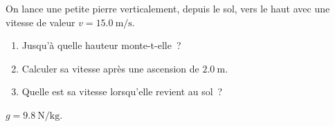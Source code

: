 On lance une petite pierre verticalement, depuis le sol, vers le haut avec une
vitesse de valeur $v=\qty{15.0}{\m\per\s}$.
\begin{enumerate}
    \item Jusqu'à quelle hauteur monte-t-elle~?
    \item Calculer sa vitesse après une ascension de $\qty{2.0}{\m}$.
    \item Quelle est sa vitesse lorsqu'elle revient au sol~?
\end{enumerate}

\begin{donnees}
    $g=\qty{9.8}{\N\per\kg}$.
\end{donnees}

